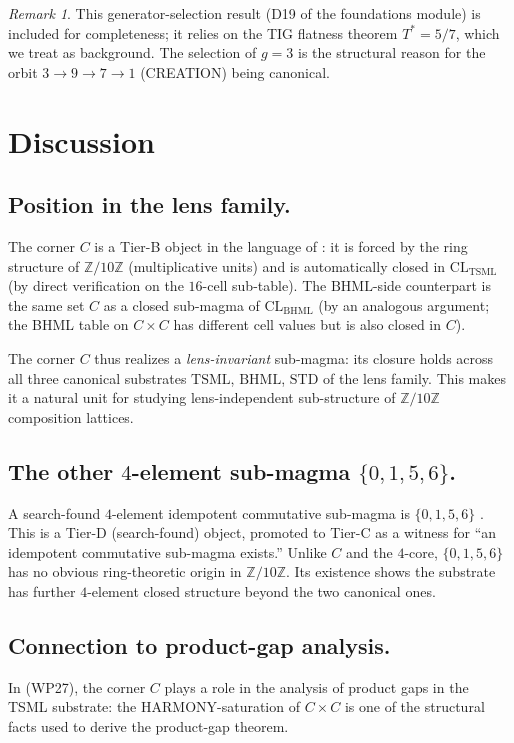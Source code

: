 \documentclass[11pt,reqno]{amsart}
\theoremstyle{plain}
\theoremstyle{definition}
\theoremstyle{remark}
\newtheorem*{remark}{Remark}
\newcommand{\Z}{\mathbb{Z}}
\newcommand{\TSML}{\mathrm{TSML}}
\newcommand{\BHML}{\mathrm{BHML}}
\begin{document}
\begin{remark}
This generator-selection result (D19 of the foundations module) is
included for completeness; it relies on the TIG flatness theorem
$T^* = 5/7$, which we treat as background. The selection of $g = 3$
is the structural reason for the orbit
$3 \to 9 \to 7 \to 1$ (CREATION) being canonical.
\end{remark}

\section{Discussion}
\label{sec:discussion}

\subsection{Position in the lens family.}
The corner $C$ is a Tier-B object in the language of
\cite{SandersGishThreeSubstrate}: it is forced by the ring structure
of $\Z/10\Z$ (multiplicative units) and is automatically closed in
$\mathrm{CL}_\TSML$ (by direct verification on the $16$-cell sub-table).
The $\BHML$-side counterpart is the same set $C$ as a closed
sub-magma of $\mathrm{CL}_\BHML$ (by an analogous argument; the BHML
table on $C \times C$ has different cell values but is also closed in $C$).

The corner $C$ thus realizes a \emph{lens-invariant} sub-magma:
its closure holds across all three canonical substrates $\TSML$,
$\BHML$, $\mathrm{STD}$ of the lens family. This makes it a natural
unit for studying lens-independent sub-structure of $\Z/10\Z$
composition lattices.

\subsection{The other $4$-element sub-magma $\{0, 1, 5, 6\}$.}
A search-found $4$-element idempotent commutative sub-magma is
$\{0, 1, 5, 6\}$ \cite{LensCatalog}. This is a Tier-D
(search-found) object, promoted to Tier-C as a witness for
``an idempotent commutative sub-magma exists.'' Unlike $C$ and the
$4$-core, $\{0, 1, 5, 6\}$ has no obvious ring-theoretic origin in
$\Z/10\Z$. Its existence shows the substrate has further
$4$-element closed structure beyond the two canonical ones.

\subsection{Connection to product-gap analysis.}
In \cite{SandersGishProductGap} (WP27), the corner $C$ plays a role
in the analysis of product gaps in the TSML substrate: the
HARMONY-saturation of $C \times C$ is one of the structural facts
used to derive the product-gap theorem.
\end{document}
